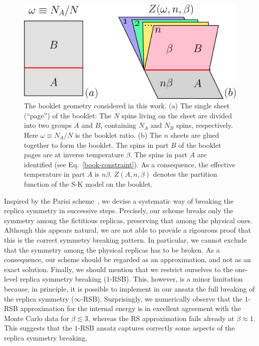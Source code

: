 \documentclass[twocolumn,superscriptaddress,prb,10pt]{revtex4-1}
\begin{document}
\begin{figure}[t]
\includegraphics*[width=0.93\linewidth]{./draft_figs/cartoon}
\caption{ The booklet geometry considered in this work. (a) The single sheet 
 (``page'') of the booklet: The $N$ spins living on the sheet are divided into 
 two groups $A$ and $B$, containing $N_A$ and $N_B$ spins, respectively. Here 
 $\omega\equiv N_A/N$ is the booklet ratio. (b) The $n$ sheets are glued together 
 to form the booklet. The spins in part $B$ of the booklet pages are at inverse 
 temperature $\beta$. The spins in part $A$ are identified  (see Eq.~\eqref{book-constraint}). 
 As a consequence, the effective temperature in part $A$ is $n\beta$. 
 $Z(A,n,\beta)$ denotes the partition function of the S-K model on 
 the booklet. 
}
\label{cartoon}
\end{figure}

Inspired by the Parisi scheme~\cite{parisi-1979}, we devise a systematic 
way of breaking the replica symmetry in successive steps. Precisely, our scheme  
breaks only the symmetry among the fictitious replicas, preserving that among the 
physical ones. Although this appears natural, we are not able to provide a rigourous 
proof that this is the correct symmetry breaking pattern. In particular, we cannot 
exclude that the symmetry among the physical replicas has to be broken. As a consequence, 
our scheme should be regarded as an approximation, and not as an exact solution. 
Finally, we should mention that we restrict ourselves to the one-level replica symmetry 
breaking ($1$-RSB). This, however, is a minor limitation because, in principle, it is 
possible to implement in our ansatz the full breaking of the replica symmetry 
($\infty$-RSB). Surprisingly, we numerically observe that the $1$-RSB approximation 
for the internal energy is in excellent agreement with the Monte Carlo data for  
$\beta\lesssim 3$, whereas the RS approximation fails already at $\beta\approx 1$. 
This suggests that the $1$-RSB ansatz captures correctly some aspects of the 
replica symmetry breaking. 
\end{document}
